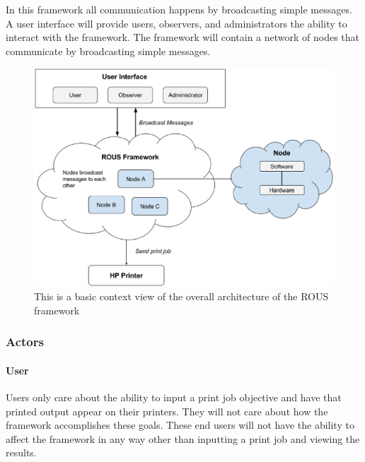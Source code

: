 \documentclass[draftclsnofoot, onecolumn, compsoc, 10pt]{IEEEtran}
\begin{document}
In this framework all communication happens by broadcasting simple messages. A user interface will provide users, observers, and administrators the ability to interact with the framework. The framework will contain a network of nodes that communicate by broadcasting simple messages. 
\begin{figure}[H]
\centering
	\includegraphics[scale=.45]{context}
	\captionsetup{justification=centering}
    \caption{This is a basic context view of the overall architecture of the ROUS framework}
\end{figure}


\subsubsection{Actors}
\paragraph{User}
Users only care about the ability to input a print job objective and have that printed output appear on their printers. They will not care about how the framework accomplishes these goals. These end users will not have the ability to affect the framework in any way other than inputting a print job and viewing the results.
\end{document}
